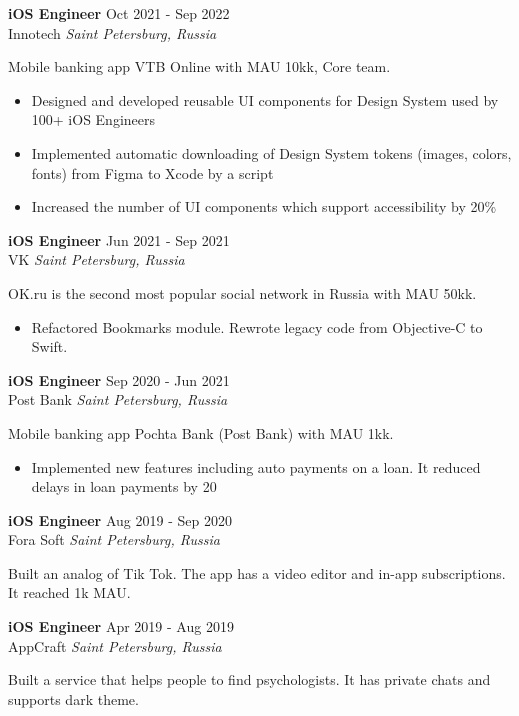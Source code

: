 \documentclass[a4paper,10pt]{article}
\begin{document}
\textbf{iOS Engineer} \hfill Oct 2021 - Sep 2022\\
Innotech \hfill \textit{Saint Petersburg, Russia}

Mobile banking app VTB Online with MAU 10kk, Core team.
 \begin{itemize}
    \itemsep -5pt {} 
     \item Designed and developed reusable UI components for Design System used by 100+ iOS Engineers
     \item Implemented automatic downloading of Design System tokens (images, colors, fonts) from Figma to Xcode by a script
     \item Increased the number of UI components which support accessibility by 20\%
 \end{itemize}

\textbf{iOS Engineer} \hfill Jun 2021 - Sep 2021\\
VK \hfill \textit{Saint Petersburg, Russia}

OK.ru is the second most popular social network in Russia with MAU 50kk.
 \begin{itemize}
    \itemsep -5pt {} 
     \item Refactored Bookmarks module. Rewrote legacy code from Objective-C to Swift.
 \end{itemize}

\textbf{iOS Engineer} \hfill Sep 2020 - Jun 2021\\
Post Bank \hfill \textit{Saint Petersburg, Russia}

Mobile banking app Pochta Bank (Post Bank) with MAU 1kk.
 \begin{itemize}
    \itemsep -5pt {} 
     \item Implemented new features including auto payments on a loan. It reduced delays in loan payments by 20%
 \end{itemize}

\textbf{iOS Engineer} \hfill Aug 2019 - Sep 2020\\
Fora Soft \hfill \textit{Saint Petersburg, Russia}

Built an analog of Tik Tok. The app has a video editor and in-app subscriptions. It reached 1k MAU.

\textbf{iOS Engineer} \hfill Apr 2019 - Aug 2019\\
AppCraft \hfill \textit{Saint Petersburg, Russia}

Built a service that helps people to find psychologists. It has private chats and supports dark theme.
\end{document}
